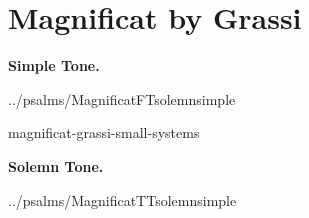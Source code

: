 {
\pagebreak
\thispagestyle{empty}
\newcommand{\printsimpletone}{
\needspace{3\baselineskip}
\begin{center}\textbf{Simple Tone.}\end{center}
\vspace{0ex plus 0ex minus 2ex}
}
\newcommand{\printsolemntone}{
\needspace{3\baselineskip}
\begin{center}\textbf{Solemn Tone.}\end{center}
\vspace{0ex plus 0ex minus 1ex}
}

\label{magnificat-grassi}
\vspace*{-\headheight}
\section{Magnificat by Grassi}

\def\betweenLilyPondSystem#1{
  \ifnum#1>1
    \vfil\noindent
  \else
    \linebreak
  \fi
}
\newcommand{\includelilypond}[1]{
  \noindent
  {#1}
}
\def\magsolemn{F}
\def\maggrassi{T}
\def\annot{\magtone. \magend}
\def\greinitialformat#1{%
{\fontsize{50}{50}\selectfont #1}%
}
\def\magoddverses{}
\global\def\magtex{../psalms/Magnificat\if\magsolemn Tsolemn\else simple\fi\magtone\nostarendmag}
\greblockcustos
\printsimpletone{}
\begin{oddversesmagnificat}{\magtex}
\magoddverses
\end{oddversesmagnificat}

\includelilypond{magnificat-grassi-small-systems}



\def\magsolemn{T}
\let\magant=\undefined
\let\magantlinetwo=\undefined
\let\magtex=\undefined
\let\magverses=\undefined
{}
\def\annot{\magtone. \magend}
\global\def\magtex{../psalms/Magnificat\if\magsolemn Tsolemn\else simple\fi\magtone\nostarendmag}
\printsolemntone{}
\begin{oddversesmagnificat}{\magtex}
\magoddverses
\end{oddversesmagnificat}
}
